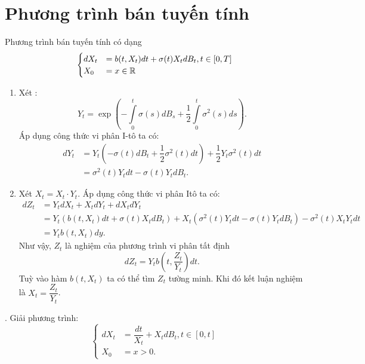 \section{Phương trình bán tuyến tính}
\begin{defn} Phương trình bán tuyến tính có dạng    
        \[\begin{cases}
            dX_t &= b(t,X_t)dt+ \sigma(t) X_t dB_t, t \in [0,T]\\
            X_0 &= x \in \mathbb{R}
         \end{cases}\]     
\end{defn} 
\begin{sol*} 
    \begin{enumerate}
        \item Xét \qtnn:
        \[Y_t = \exp \left(-\int\limits_0^t \sigma(s) dB_s + \dfrac{1}{2} \int\limits_0^t \sigma^2(s) ds \right). \]
        Áp dụng công thức vi phân I-tô ta có:
        \begin{align*}
            dY_t &= Y_t \left(-\sigma(t) dB_t + \dfrac{1}{2} \sigma^2(t) dt \right) + \dfrac{1}{2} Y_t \sigma^2(t) dt \\
            &= \sigma^2(t) Y_t dt - \sigma(t) Y_t dB_t.           
        \end{align*}
        \item Xét $X_t = X_t \cdot Y_t$. Áp dụng công thức vi phân Itô ta có:
        \begin{align*}
            dZ_t &= Y_t dX_t + X_t dY_t + dX_t dY_t\\
            &= Y_t \left(b(t,X_t)dt + \sigma(t) X_t dB_t \right) + X_t \left( \sigma^2(t) Y_t dt - \sigma(t) Y_t dB_t  \right) - \sigma^2(t) X_t Y_t dt  \\
            &= Y_t b(t,X_t) dy.
        \end{align*}
        Như vậy, $Z_t$ là nghiệm của phương trình vi phân tất định
        \[dZ_t = Y_t b\left(t, \dfrac{Z_t}{Y_t} \right) dt.\]
        Tuỳ vào hàm $b(t,X_t)$ ta có thể tìm $Z_t$ tường minh. Khi đó kết luận nghiệm là $X_t = \dfrac{Z_t}{Y_t}$.
    \end{enumerate}
\end{sol*}
\examplename. Giải phương trình: 
\[\begin{cases}
    dX_t &= \dfrac{dt}{X_t} + X_t dB_t, t \in [0,t]\\
    X_0 &= x >0.
\end{cases}\]
